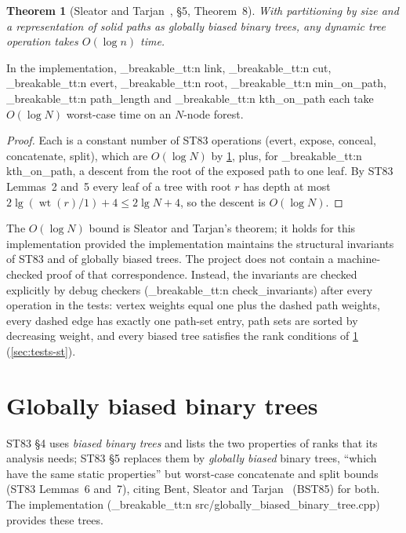 \documentclass[11pt,a4paper,oneside]{report}
\theoremstyle{plain}
\newtheorem{theorem}{Theorem}[chapter]
\theoremstyle{definition}
\theoremstyle{remark}
\DeclareRobustCommand{\code}[1]{\mtp_breakable_tt:n {#1}}
\DeclareRobustCommand{\file}[1]{\mtp_breakable_tt:n {#1}}
\newcommand{\wt}{\operatorname{wt}}
\begin{document}
\begin{theorem}[Sleator and Tarjan~\cite{sleator1983}, \S5, Theorem~8]\label{thm:st83}
With partitioning by size and a representation of solid paths as globally biased binary
trees, any dynamic tree operation takes \(O(\log n)\) time.
\end{theorem}

\begin{corollary}\label{cor:st83-aug}
In the implementation, \code{link}, \code{cut}, \code{evert}, \code{root},
\code{min_on_path}, \code{path_length} and \code{kth_on_path} each take \(O(\log N)\)
worst-case time on an \(N\)-node forest.
\end{corollary}
\begin{proof}
Each is a constant number of ST83 operations (evert, expose, conceal, concatenate, split), which
are \(O(\log N)\) by \cref{thm:st83}, plus, for \code{kth_on_path}, a descent from the root of
the exposed path to one leaf. By ST83 Lemmas~2 and~5 every leaf of a tree with root \(r\) has
depth at most \(2\lg(\wt(r)/1)+4\le 2\lg N+4\), so the descent is \(O(\log N)\).
\end{proof}

\begin{caution}
The \(O(\log N)\) bound is Sleator and Tarjan's theorem; it holds for this implementation
provided the implementation maintains the structural invariants of ST83 and of globally biased
trees. The project does not contain a machine-checked proof of that correspondence. Instead,
the invariants are checked explicitly by debug checkers (\code{check_invariants}) after every
operation in the tests: vertex weights equal one plus the dashed path weights, every dashed edge
has exactly one path-set entry, path sets are sorted by decreasing weight, and every biased tree
satisfies the rank conditions of \cref{sec:bst85} (\cref{sec:tests-st}).
\end{caution}

\section{Globally biased binary trees}\label{sec:bst85}
ST83 \S4 uses \emph{biased binary trees} and lists the two properties of ranks that its analysis
needs; ST83 \S5 replaces them by \emph{globally biased} binary trees, ``which have the same
static properties'' but worst-case concatenate and split bounds (ST83 Lemmas~6 and~7), citing
Bent, Sleator and Tarjan~\cite{bent1985} (BST85) for both. The implementation
(\file{src/globally_biased_binary_tree.cpp}) provides these trees.
\end{document}
